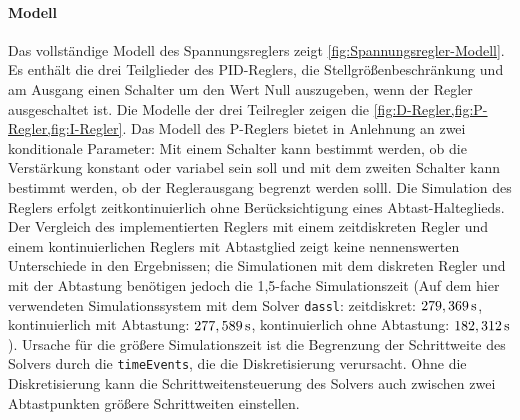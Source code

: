 \paragraph{Modell}\label{modell-Regler}
Das vollständige Modell des Spannungsreglers zeigt \cref{fig:Spannungsregler-Modell}. Es enthält die drei Teilglieder des PID-Reglers, die Stellgrößenbeschränkung und am Ausgang einen Schalter um den Wert Null auszugeben, wenn der Regler ausgeschaltet ist. Die Modelle der drei Teilregler zeigen die \cref{fig:D-Regler,fig:P-Regler,fig:I-Regler}. Das Modell des P-Reglers bietet in Anlehnung an \cite{DigitalerSpannungsreglerSoftwaredokumentation} zwei konditionale Parameter: Mit einem Schalter kann bestimmt werden, ob die Verstärkung konstant oder variabel sein soll und mit dem zweiten Schalter kann bestimmt werden, ob der Reglerausgang begrenzt werden solll. Die Simulation des Reglers erfolgt zeitkontinuierlich ohne Berücksichtigung eines Abtast-Halteglieds. Der Vergleich des implementierten Reglers mit einem zeitdiskreten Regler und einem kontinuierlichen Reglers mit Abtastglied zeigt keine nennenswerten Unterschiede in den Ergebnissen; die Simulationen mit dem diskreten Regler und mit der Abtastung benötigen jedoch die 1,5-fache Simulationszeit (Auf dem hier verwendeten Simulationssystem mit dem Solver \texttt{dassl}: zeitdiskret: $\unit[279,369]{s}$, kontinuierlich mit Abtastung: $\unit[277,589]{s}$, kontinuierlich ohne Abtastung: $\unit[182,312]{s}$). Ursache für die größere Simulationszeit ist die Begrenzung der Schrittweite des Solvers durch die \texttt{timeEvents}, die die Diskretisierung verursacht. Ohne die Diskretisierung kann die Schrittweitensteuerung des Solvers auch zwischen zwei Abtastpunkten größere Schrittweiten einstellen.
